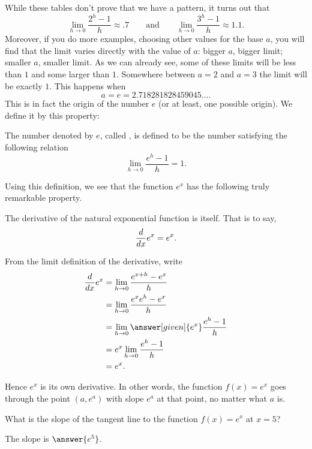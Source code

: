 \documentclass{ximera}
\begin{document}
While these tables don't prove that we have a pattern, it turns out that
\[
\lim_{h\to 0}\frac{2^h-1}{h} \approx .7 \qquad\text{and}\qquad \lim_{h\to 0} \frac{3^h-1}{h} \approx 1.1.
\]
Moreover, if you do more examples, choosing other values for the 
base $a$, you will find that the limit varies
directly with the value of $a$: bigger $a$, bigger limit; smaller $a$,
smaller limit. As we can already see, some of these limits will be
less than $1$ and some larger than $1$. Somewhere between $a=2$ and $a=3$
the limit will be exactly $1$. This happens when 
\[
a = e = 2.718281828459045\dots.
\]
This is in fact the origin of the number $e$ (or at least, one possible origin). We define it by this property:
\begin{definition}
  The number denoted by $e$, called , is defined
  to be the number satisfying the following relation
  \[
  \lim_{h\to 0} \frac{e^h-1}{h} = 1.
  \]
\end{definition}
Using this definition, we see that the function $e^x$ has the following truly remarkable property.

\begin{theorem}
The derivative of the natural exponential function is itself. That is to say,
\[
\frac{d}{\mathop{}\!d x} e^x = e^x.
\]
\begin{explanation}  
From the limit definition of the derivative, write
\begin{align*}
\ddx e^x&=\lim_{h\to 0} \frac{e^{x+h}-e^x}{h} \\
&=\lim_{h\to 0} \frac{e^xe^{h}-e^x}{h} \\
&=\lim_{h\to 0} \answer[given]{e^x}\frac{e^{h}-1}{h} \\
&=e^x\lim_{h\to 0} \frac{e^{h}-1}{h} \\
&=e^x.
\end{align*}
\end{explanation}
\end{theorem}


Hence $e^x$ is its own derivative. In other words, the function $f(x)=e^x$ goes through the point $(a,e^a)$ with slope $e^a$ at that point, no matter what $a$ is. 

\begin{question}
  What is the slope of the tangent line to the function $f(x) = e^x$ at $x = 5$?
  \begin{prompt}
    The slope is $\answer{e^5}$.
  \end{prompt}
\end{question}
\end{document}
